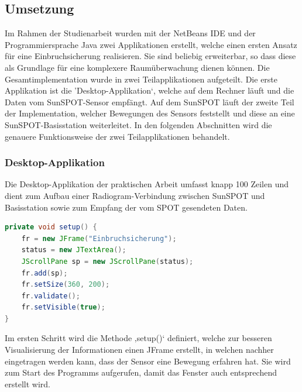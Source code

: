 \subsection{Umsetzung}\label{s:Umsetzung}

Im Rahmen der Studienarbeit wurden mit der NetBeans IDE und der Programmiersprache Java zwei Applikationen erstellt, welche einen ersten Ansatz für eine Einbruchsicherung realisieren. Sie sind beliebig erweiterbar, so dass diese als Grundlage für eine komplexere Raumüberwachung dienen können. Die Gesamtimplementation wurde in zwei Teilapplikationen aufgeteilt. Die erste Applikation ist die 'Desktop-Applikation‘, welche auf dem Rechner läuft und die Daten vom SunSPOT-Sensor empfängt. Auf dem SunSPOT läuft der zweite Teil der Implementation, welcher Bewegungen des Sensors feststellt und diese an eine SunSPOT-Basisstation weiterleitet. In den folgenden Abschnitten wird die genauere Funktionsweise der zwei Teilapplikationen behandelt.

\subsubsection{Desktop-Applikation}\label{sss:Desktop-Applikation}

Die Desktop-Applikation der praktischen Arbeit umfasst knapp 100 Zeilen und dient zum Aufbau einer Radiogram-Verbindung zwischen SunSPOT und Basisstation sowie zum Empfang der vom SPOT gesendeten Daten. \newpage

\begin{lstlisting}[language=Java,caption={Ausschnitt aus der setup()-Methode},label=lst:setup,frame=single] 
private void setup() {
	fr = new JFrame("Einbruchsicherung");
	status = new JTextArea();
	JScrollPane sp = new JScrollPane(status);
	fr.add(sp);
	fr.setSize(360, 200);
	fr.validate();
	fr.setVisible(true);
}           
\end{lstlisting}

Im ersten Schritt wird die Methode ‚setup()‘ definiert, welche zur besseren Visualisierung der Informationen einen JFrame erstellt, in welchen nachher eingetragen werden kann, dass der Sensor eine Bewegung erfahren hat. Sie wird zum Start des Programms aufgerufen, damit das Fenster auch entsprechend erstellt wird. \\

